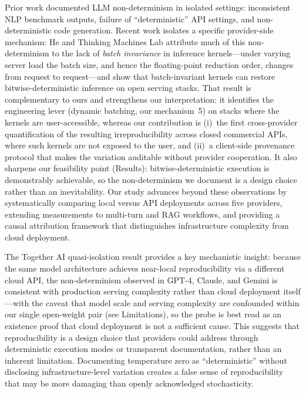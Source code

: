 \documentclass[sn-nature]{sn-jnl}
\begin{document}
Prior work documented LLM non-determinism in isolated settings: inconsistent NLP benchmark outputs\cite{chen2023chatgpt}, failure of ``deterministic'' API settings\cite{atil2024nondeterminism}, and non-deterministic code generation\cite{ouyang2024nondeterminism}.
Recent work isolates a specific provider-side mechanism: He and Thinking Machines Lab attribute much of this non-determinism to the lack of \emph{batch invariance} in inference kernels---under varying server load the batch size, and hence the floating-point reduction order, changes from request to request---and show that batch-invariant kernels can restore bitwise-deterministic inference on open serving stacks\cite{he2025nondeterminism}.
That result is complementary to ours and strengthens our interpretation: it identifies the engineering lever (dynamic batching, our mechanism~5) on stacks where the kernels are user-accessible, whereas our contribution is (i)~the first cross-provider quantification of the resulting irreproducibility across closed commercial APIs, where such kernels are not exposed to the user, and (ii)~a client-side provenance protocol that makes the variation auditable without provider cooperation. It also sharpens our feasibility point (Results): bitwise-deterministic execution is demonstrably achievable, so the non-determinism we document is a design choice rather than an inevitability.
Our study advances beyond these observations by systematically comparing local versus API deployments across five providers, extending measurements to multi-turn and RAG workflows, and providing a causal attribution framework that distinguishes infrastructure complexity from cloud deployment.

The Together AI quasi-isolation result provides a key mechanistic insight: because the same model architecture achieves near-local reproducibility via a different cloud API, the non-determinism observed in GPT-4, Claude, and Gemini is consistent with production serving complexity rather than cloud deployment itself---with the caveat that model scale and serving complexity are confounded within our single open-weight pair (see Limitations), so the probe is best read as an existence proof that cloud deployment is not a sufficient cause.
This suggests that reproducibility is a design choice that providers could address through deterministic execution modes or transparent documentation, rather than an inherent limitation.
Documenting temperature zero as ``deterministic'' without disclosing infrastructure-level variation creates a false sense of reproducibility that may be more damaging than openly acknowledged stochasticity.
\end{document}
